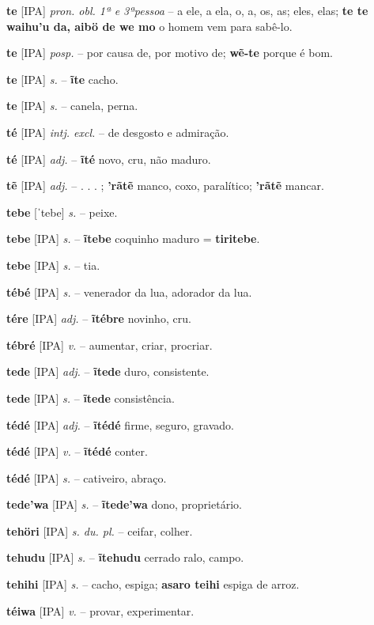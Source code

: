 \textbf{te} [IPA] \textit{pron. obl. 1ª e 3ªpessoa} -- a ele, a ela, o, a, os, as; eles, elas; \textbf{te te waihu'u da, aibö de we mo} o homem vem para sabê-lo.

\textbf{te} [IPA] \textit{posp.} -- por causa de, por motivo de; \textbf{wẽ-te} porque é bom.

\textbf{te} [IPA] \textit{s.} -- \textbf{ĩte} cacho.

\textbf{te} [IPA] \textit{s.} -- canela, perna.

\textbf{té} [IPA] \textit{intj. excl.} -- de desgosto e admiração.

\textbf{té} [IPA] \textit{adj.} -- \textbf{ĩté} novo, cru, não maduro.

\textbf{tẽ} [IPA] \textit{adj.} -- . . . ; \textbf{'rãtẽ} manco, coxo, paralítico; \textbf{'rãtẽ} mancar.

\textbf{tebe} [ˈtebe] \textit{s.} -- peixe.

\textbf{tebe} [IPA] \textit{s.} -- \textbf{ĩtebe} coquinho maduro = \textbf{tiritebe}.

\textbf{tebe} [IPA] \textit{s.} -- tia.

\textbf{tébé} [IPA] \textit{s.} -- venerador da lua, adorador da lua.

\textbf{tére} [IPA] \textit{adj.} -- \textbf{ĩtébre} novinho, cru.

\textbf{tébré} [IPA] \textit{v.} -- aumentar, criar, procriar.

\textbf{tede} [IPA] \textit{adj.} -- \textbf{ĩtede} duro, consistente.

\textbf{tede} [IPA] \textit{s.} -- \textbf{ĩtede} consistência.

\textbf{tédé} [IPA] \textit{adj.} -- \textbf{ĩtédé} firme, seguro, gravado.

\textbf{tédé} [IPA] \textit{v.} -- \textbf{ĩtédé} conter.

\textbf{tédé} [IPA] \textit{s.} -- cativeiro, abraço.

\textbf{tede'wa} [IPA] \textit{s.} -- \textbf{ĩtede'wa} dono, proprietário.

\textbf{tehöri} [IPA] \textit{s. du. pl.} -- ceifar, colher.

\textbf{tehudu} [IPA] \textit{s.} -- \textbf{ĩtehudu} cerrado ralo, campo.

\textbf{tehihi} [IPA] \textit{s.} -- cacho, espiga; \textbf{asaro teihi} espiga de arroz.

\textbf{téiwa} [IPA] \textit{v.} -- provar, experimentar.

